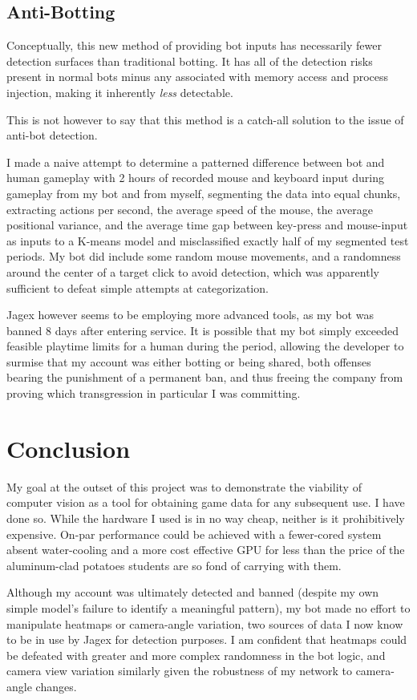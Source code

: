 \documentclass[sigconf]{acmart}
\begin{document}
\subsection{Anti-Botting}
Conceptually, this new method of providing bot inputs has necessarily fewer detection surfaces than traditional botting. It has all of the detection risks present in normal bots minus any associated with memory access and process injection, making it inherently \textit{less} detectable. 

This is not however to say that this method is a catch-all solution to the issue of anti-bot detection.

I made a naive attempt to determine a patterned difference between bot and human gameplay with 2 hours of recorded mouse and keyboard input during gameplay from my bot and from myself, segmenting the data into equal chunks, extracting actions per second, the average speed of the mouse, the average positional variance, and the average time gap between key-press and mouse-input as inputs to a K-means model and misclassified exactly half of my segmented test periods. My bot did include some random mouse movements, and a randomness around the center of a target click to avoid detection, which was apparently sufficient to defeat simple attempts at categorization.

Jagex however seems to be employing more advanced tools, as my bot was banned 8 days after entering service. It is possible that my bot simply exceeded feasible playtime limits for a human during the period, allowing the developer to surmise that my account was either botting or being shared, both offenses bearing the punishment of a permanent ban, and thus freeing the company from proving which transgression in particular I was committing.

\section{Conclusion}

My goal at the outset of this project was to demonstrate the viability of computer vision as a tool for obtaining game data for any subsequent use. I have done so. While the hardware I used is in no way cheap, neither is it prohibitively expensive. On-par performance could be achieved with a fewer-cored system absent water-cooling and a more cost effective GPU for less than the price of the aluminum-clad potatoes students are so fond of carrying with them.

Although my account was ultimately detected and banned (despite my own simple model's failure to identify a meaningful pattern), my bot made no effort to manipulate heatmaps or camera-angle variation, two sources of data I now know to be in use by Jagex for detection purposes. I am confident that heatmaps could be defeated with greater and more complex randomness in the bot logic, and camera view variation similarly given the robustness of my network to camera-angle changes.
\end{document}
